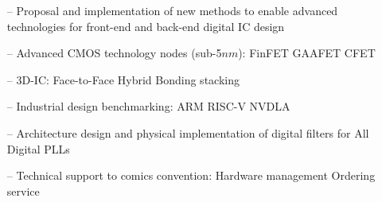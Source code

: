 \documentclass[10pt,a4paper]{altacv}
\begin{document}
\medskip


\medskip






\begin{itemize}
    \setlength{\itemindent}{0.5em}
    \item[--] \small{Proposal and implementation of new methods to enable advanced technologies for front-end and back-end digital IC design}
    \item[--] \small{Advanced CMOS technology nodes (sub-5$nm$): FinFET \textbullet\hspace{0.1em} GAAFET \textbullet\hspace{0.1em} CFET}
    \item[--] \small{3D-IC: Face-to-Face Hybrid Bonding stacking}
    \item[--] \small{Industrial design benchmarking: ARM \textbullet\hspace{0.1em} RISC-V \textbullet\hspace{0.1em} NVDLA}
\end{itemize}




\begin{itemize}
    \setlength{\itemindent}{0.5em}
    \item[--]  \small {Architecture design and physical implementation of digital filters for All Digital PLLs}
    
\end{itemize}



\begin{itemize}
    \setlength{\itemindent}{0.5em}
    \item[--]  \small {Technical support to comics convention: Hardware management \textbullet\hspace{0.1em} Ordering service}
\end{itemize}
\end{document}
